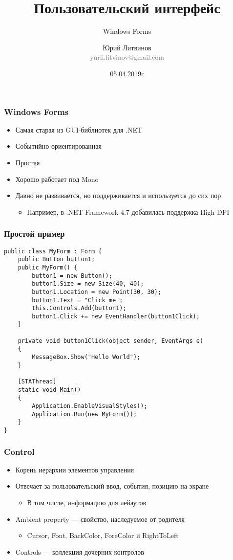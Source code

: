 \documentclass[xetex,mathserif,serif]{beamer}
\title{Пользовательский интерфейс}
\subtitle{Windows Forms}
\author[Юрий Литвинов]{Юрий Литвинов\\\small{\textcolor{gray}{yurii.litvinov@gmail.com}}}
\date{05.04.2019г}
\begin{document}
	\frame{\titlepage}

	\begin{frame}
		\frametitle{Windows Forms}
		\begin{itemize}
			\item Самая старая из GUI-библиотек для .NET
			\item Событийно-ориентированная
			\item Простая
			\item Хорошо работает под Mono
			\item Давно не развивается, но поддерживается и используется до сих пор
			\begin{itemize}
				\item Например, в .NET Framework 4.7 добавилась поддержка High DPI
			\end{itemize}
		\end{itemize}
	\end{frame}

	\begin{frame}[fragile]
		\frametitle{Простой пример}
		\begin{scriptsize}
			\begin{verbatim}
public class MyForm : Form {
    public Button button1;
    public MyForm() {
        button1 = new Button();
        button1.Size = new Size(40, 40);
        button1.Location = new Point(30, 30);
        button1.Text = "Click me";
        this.Controls.Add(button1);
        button1.Click += new EventHandler(button1Click);
    }

    private void button1Click(object sender, EventArgs e)
    {
        MessageBox.Show("Hello World");
    }

    [STAThread]
    static void Main()
    {
        Application.EnableVisualStyles();
        Application.Run(new MyForm());
    }
}
			\end{verbatim}
		\end{scriptsize}
	\end{frame}

	\begin{frame}
		\frametitle{Control}
		\begin{itemize}
			\item Корень иерархии элементов управления
			\item Отвечает за пользовательский ввод, события, позицию на экране
			\begin{itemize}
				\item В том числе, информацию для лейаутов
			\end{itemize}
			\item Ambient property --- свойство, наследуемое от родителя
			\begin{itemize}
				\item Cursor, Font, BackColor, ForeColor и RightToLeft
			\end{itemize}
			\item Controls --- коллекция дочерних контролов
		\end{itemize}
	\end{frame}
\end{document}
